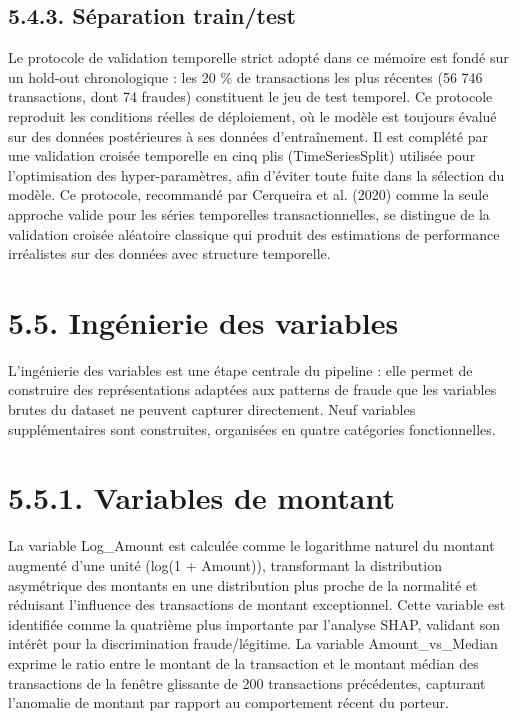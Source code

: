 \subsection{5.4.3. Séparation train/test}

Le protocole de validation temporelle strict adopté dans ce mémoire est fondé sur un hold-out chronologique : les 20 \% de transactions les plus récentes (56 746 transactions, dont 74 fraudes) constituent le jeu de test temporel. Ce protocole reproduit les conditions réelles de déploiement, où le modèle est toujours évalué sur des données postérieures à ses données d'entraînement. Il est complété par une validation croisée temporelle en cinq plis (TimeSeriesSplit) utilisée pour l'optimisation des hyper-paramètres, afin d'éviter toute fuite dans la sélection du modèle. Ce protocole, recommandé par Cerqueira et al. (2020) comme la seule approche valide pour les séries temporelles transactionnelles, se distingue de la validation croisée aléatoire classique qui produit des estimations de performance irréalistes sur des données avec structure temporelle.

\section{5.5. Ingénierie des variables}

L'ingénierie des variables est une étape centrale du pipeline : elle permet de construire des représentations adaptées aux patterns de fraude que les variables brutes du dataset ne peuvent capturer directement. Neuf variables supplémentaires sont construites, organisées en quatre catégories fonctionnelles.

\section{5.5.1. Variables de montant}

La variable Log\_Amount est calculée comme le logarithme naturel du montant augmenté d'une unité (log(1 + Amount)), transformant la distribution asymétrique des montants en une distribution plus proche de la normalité et réduisant l'influence des transactions de montant exceptionnel. Cette variable est identifiée comme la quatrième plus importante par l'analyse SHAP, validant son intérêt pour la discrimination fraude/légitime. La variable Amount\_vs\_Median exprime le ratio entre le montant de la transaction et le montant médian des transactions de la fenêtre glissante de 200 transactions précédentes, capturant l'anomalie de montant par rapport au comportement récent du porteur.

